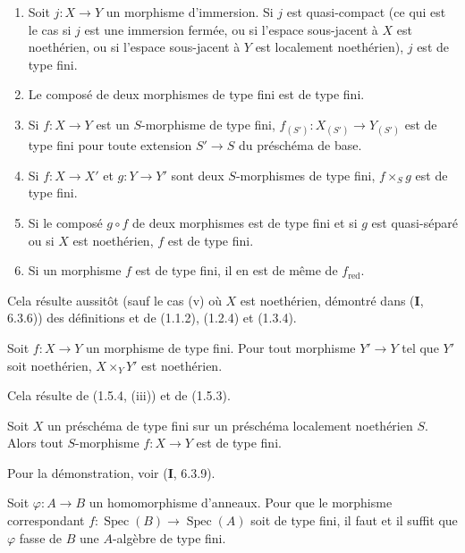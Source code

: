 \begin{proposition}[1.5.4]
\label{IV.1.5.4-fr}
\begin{enumerate}
  \item[\textup{(i)}] Soit $j:X\to Y$ un morphisme d'immersion. Si $j$ est
  quasi-compact (ce qui est le cas si $j$ est une immersion fermée, ou si
  l'espace sous-jacent à $X$ est noethérien, ou si l'espace sous-jacent à $Y$
  est localement noethérien), $j$ est de type fini.
  \item[\textup{(ii)}] Le composé de deux morphismes de type fini est de type fini.
  \item[\textup{(iii)}] Si $f:X\to Y$ est un $S$-morphisme de type fini,
  $f_{(S')}:X_{(S')}\to Y_{(S')}$ est de type fini pour toute extension
  $S'\to S$ du préschéma de base.
  \item[\textup{(iv)}] Si $f:X\to X'$ et $g:Y\to Y'$ sont deux $S$-morphismes de type
  fini, $f\times_Sg$ est de type fini.
  \item[\textup{(v)}] Si le composé $g\circ f$ de deux morphismes est de type fini et
  si $g$ est quasi-séparé ou si $X$ est noethérien, $f$ est de type fini.
  \item[\textup{(vi)}] Si un morphisme $f$ est de type fini, il en est de même de
  $f_{\mathrm{red}}$.
\end{enumerate}
\end{proposition}

Cela résulte aussitôt (sauf le cas (v) où $X$ est noethérien, démontré dans
(\textbf{I}, 6.3.6)) des définitions et de (1.1.2), (1.2.4) et (1.3.4).

\begin{corollary}[1.5.5]
\label{IV.1.5.5-fr}
Soit $f:X\to Y$ un morphisme de type fini. Pour tout morphisme $Y'\to Y$ tel
que $Y'$ soit noethérien, $X\times_YY'$ est noethérien.
\end{corollary}

Cela résulte de (1.5.4, (iii)) et de (1.5.3).

\begin{corollary}[1.5.6]
\label{IV.1.5.6-fr}
Soit $X$ un préschéma de type fini sur un préschéma localement noethérien $S$.
Alors tout $S$-morphisme $f:X\to Y$ est de type fini.
\end{corollary}

Pour la démonstration, voir (\textbf{I}, 6.3.9).

\begin{proposition}[1.5.7]
\label{IV.1.5.7-fr}
Soit $\varphi:A\to B$ un homomorphisme d'anneaux. Pour que le morphisme
correspondant $f:\operatorname{Spec}(B)\to\operatorname{Spec}(A)$ soit de type fini, il faut et il suffit
que $\varphi$ fasse de $B$ une $A$-algèbre de type fini.
\end{proposition}

